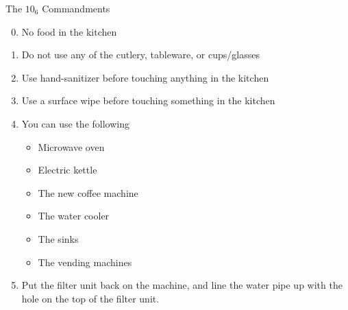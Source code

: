 \documentclass[a3paper]{article}
\begin{document}

\maketitle

\null
\vspace{-0.2cm}

\fontsize{18}{20}\selectfont

\vspace{-1.7cm}

\hspace{-0.9cm}\noindent The $10_6$ Commandments

\vspace{1.5cm}

\begin{enumerate}

\setcounter{enumi}{-1}

\itemsep-0.1cm

\item No food in the kitchen

\item Do not use any of the cutlery, tableware, or cups/glasses

\item Use hand-sanitizer before touching anything in the kitchen

\item Use a surface wipe before touching something in the kitchen

\item You can use the following

\begin{itemize}

\item Microwave oven

\item Electric kettle

\item The new coffee machine

\item The water cooler

\item The sinks

\item The vending machines

\end{itemize}

\item Put the filter unit back on the machine, and line the water pipe up with
the hole on the top of the filter unit.

\end{enumerate}

\underskriv
\end{document}
